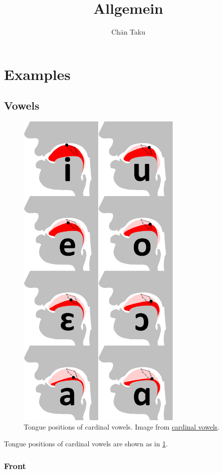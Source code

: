 \documentclass{article}
\title{Allgemein}
\author{Ch\=an Taku}
\begin{document}
\maketitle

\section{Examples}

\subsection{Vowels}

\begin{figure}[htbp]
    \centering
    \includegraphics[width=8cm]{img/VowelTongue.png}
    \caption{Tongue positions of cardinal vowels. Image from \href{https://en.wikipedia.org/wiki/Cardinal_vowels}{cardinal vowels}.}
    \label{fig:vowel_tongue}
\end{figure}

Tongue positions of cardinal vowels are shown as in \cref{fig:vowel_tongue}.

\subsubsection{Front}
\end{document}
